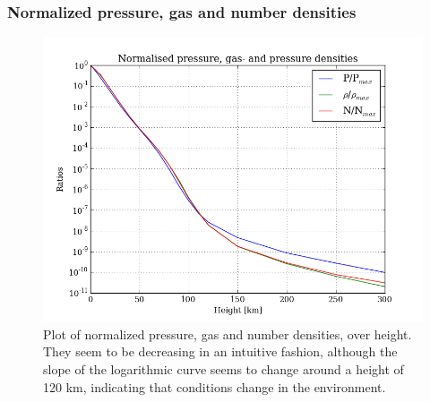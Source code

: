 \documentclass[11pt,a4paper,notitlepage]{article}
\begin{document}
\subsubsection{Normalized pressure, gas and number densities}
\begin{figure}[H]
\center

	\includegraphics[scale=0.42]{../figs/earth_pres_dens_vs_h.png}
	\caption{Plot of normalized pressure, gas and number densities, over height.\\
	They seem to be decreasing in an intuitive fashion, although the slope of the logarithmic curve seems to change around a height of 120 km, indicating that conditions change in the environment.}
\end{figure}
\end{document}
